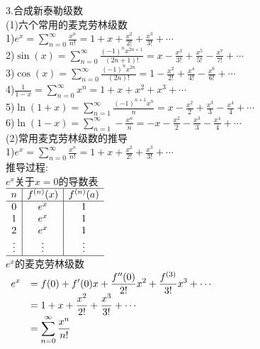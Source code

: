 3.合成新泰勒级数\\
(1)六个常用的麦克劳林级数\\
\phantom{\quad}1)\quad$\displaystyle e^x=\sum_{n=0}^{\infty}\frac{x^n}{n!}=1+x+\frac{x^2}{2!}+\frac{x^3}{3!}+\cdots$\\[1ex]
\phantom{\quad}2)\quad$\displaystyle\sin(x)=\sum_{n=0}^{\infty}\frac{(-1)^nx^{2n+1}}{(2n+1)!}=x-\frac{x^3}{3!}+\frac{x^5}{5!}-\frac{x^7}{7!}+\cdots$\\[1ex]
\phantom{\quad}3)\quad$\displaystyle\cos(x)=\sum_{n=0}^{\infty}\frac{(-1)^nx^{2n}}{(2n)!}=1-\frac{x^2}{2!}+\frac{x^4}{4!}-\frac{x^6}{6!}+\cdots$\\[1ex]
\phantom{\quad}4)\quad$\displaystyle\frac{1}{1-x}=\sum_{n=0}^{\infty}x^n=1+x+x^2+x^3+\cdots$\\[1ex]
\phantom{\quad}5)\quad$\displaystyle\ln(1+x)=\sum_{n=1}^{\infty}\frac{(-1)^{n+1}x^n}{n}=x-\frac{x^2}{2}+\frac{x^3}{3}-\frac{x^4}{4}+\cdots$\\[1ex]
\phantom{\quad}6)\quad$\displaystyle\ln(1-x)=\sum_{n=1}^{\infty}-\frac{x^n}{n}=-x-\frac{x^2}{2}-\frac{x^3}{3}-\frac{x^4}{4}+\cdots$\\[2ex]

(2)常用麦克劳林级数的推导\\
1)\quad$\displaystyle e^x=\sum_{n=0}^{\infty}\frac{x^n}{n!}=1+x+\frac{x^2}{2!}+\frac{x^3}{3!}+\cdots$\\[1ex]
推导过程:\\
$e^x$关于$x=0$的导数表\\[1ex]
$\begin{array}{c|c|c}
\hline
n & f^{(n)}(x) & f^{(n)}(a)\\
\hline
0 & e^x & 1\\
1 & e^x & 1\\
2 & e^x & 1\\
\vdots & \vdots & \vdots\\
\hline
\end{array}$\\[1ex]
$e^x$的麦克劳林级数\\
$\begin{array}{>{\displaystyle}r >{\displaystyle}l}
e^x & =f(0)+f'(0)x+\frac{f''(0)}{2!}x^2+\frac{f^{(3)}}{3!}x^3+\cdots\\
& =1+x+\frac{x^2}{2!}+\frac{x^3}{3!}+\cdots\\
& =\sum_{n=0}^{\infty}\frac{x^n}{n!}
\end{array}$\\[1ex]


